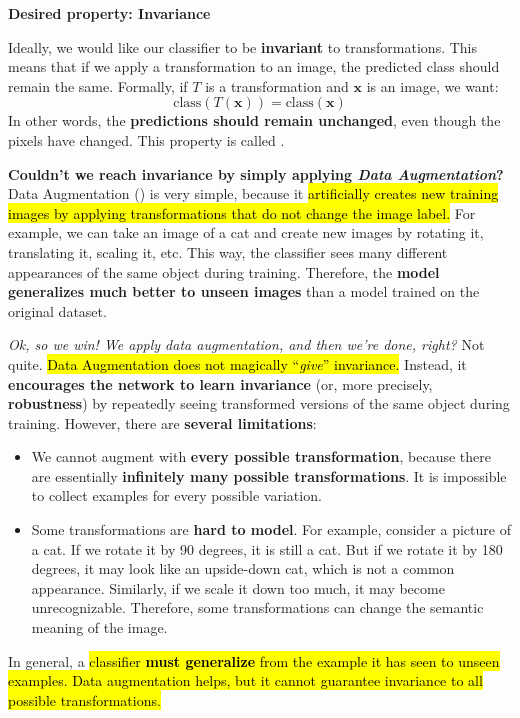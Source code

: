 \highspace
\begin{flushleft}
    \textcolor{Green3}{ \textbf{Desired property: Invariance}}
\end{flushleft}
Ideally, we would like our classifier to be \textbf{invariant} to transformations. This means that if we apply a transformation to an image, the predicted class should remain the same. Formally, if $T$ is a transformation and $\mathbf{x}$ is an image, we want:
\begin{equation*}
    \text{class}(T(\mathbf{x})) = \text{class}(\mathbf{x})
\end{equation*}
In other words, the \textbf{predictions should remain unchanged}, even though the pixels have changed. This property is called .

\highspace
\textcolor{Green3}{ \textbf{Couldn't we reach invariance by simply applying \emph{Data Augmentation}?}} Data Augmentation () is very simple, because it \hl{artificially creates new training images by applying transformations that do not change the image label.} For example, we can take an image of a cat and create new images by rotating it, translating it, scaling it, etc. This way, the classifier sees many different appearances of the same object during training. Therefore, the \textbf{model generalizes much better to unseen images} than a model trained on the original dataset.

\highspace
\emph{Ok, so we win! We apply data augmentation, and then we're done, right?} Not quite. \hl{Data Augmentation does not magically ``\emph{give}'' invariance.} Instead, it \textbf{encourages the network to learn invariance} (or, more precisely, \textbf{robustness}) by repeatedly seeing transformed versions of the same object during training. However, there are \textbf{several limitations}:
\begin{itemize}
    \item We cannot augment with \textbf{every possible transformation}, because there are essentially \textbf{infinitely many possible transformations}. It is impossible to collect examples for every possible variation.
    \item Some transformations are \textbf{hard to model}. For example, consider a picture of a cat. If we rotate it by 90 degrees, it is still a cat. But if we rotate it by 180 degrees, it may look like an upside-down cat, which is not a common appearance. Similarly, if we scale it down too much, it may become unrecognizable. Therefore, some transformations can change the semantic meaning of the image.
\end{itemize}
In general, a \hl{classifier \textbf{must generalize} from the example it has seen to unseen examples. Data augmentation helps, but it cannot guarantee invariance to all possible transformations.}

